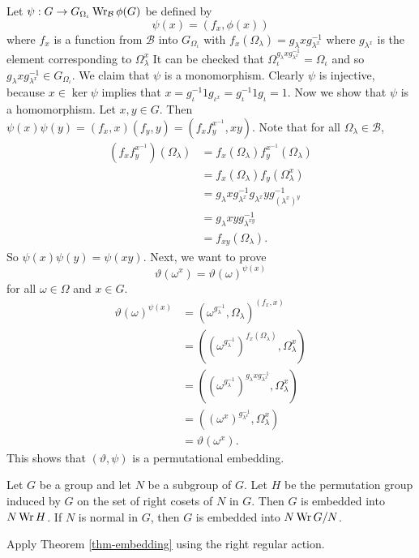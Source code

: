 \begin{sketch}
	Let $\psi:G \to G_{\Omega_\iota} \operatorname{Wr}_{\mathcal{B}} \phi(G)$ be defined by
	\begin{equation*}
		\psi(x) = (f_x,\phi(x))
	\end{equation*}
	where $f_x$ is a function from $\mathcal{B}$ into $G_{\Omega_\iota}$ with $f_x(\Omega_\lambda) = g_{\lambda}xg_{\lambda^x}^{-1}$ where $g_{\lambda^x}$ is the element corresponding to $\Omega_\lambda^x$ It can be checked that $\Omega_\iota^{g_\lambda xg_{\lambda^x}^{-1}} = \Omega_\iota$ and so $g_\lambda xg_{\lambda^x}^{-1}\in G_{\Omega_\iota}$. We claim that $\psi$ is a monomorphism. Clearly $\psi$ is injective, because $x\in \ker \psi$ implies that  $x =g_\iota^{-1} 1 g_{\iota^x} = g_\iota^{-1} 1 g_{\iota} =1$. Now we show that $\psi$ is a homomorphism. Let $x,y\in G$. Then $
		\psi(x)\psi(y) = (f_x,x)(f_y,y) = (f_xf_y^{x^{-1}},xy)$. Note that for all $\Omega_\lambda \in \mathcal{B}$, 
\begin{align*}
	(f_xf_y^{x^{-1}})(\Omega_\lambda) &= f_x(\Omega_\lambda)f_y^{x^{-1}}(\Omega_\lambda) 
	\\
	&= f_x(\Omega_\lambda)f_y(\Omega_\lambda^x) 
	\\
	&= g_{\lambda}xg_{\lambda^x}^{-1}g_{\lambda^x}yg_{(\lambda^{x})^y}^{-1} 
	\\
	&= g_\lambda xy g_{\lambda^{xy}}^{-1} 
	\\
	&= f_{xy}(\Omega_\lambda).
\end{align*}
So $\psi(x)\psi(y) = \psi(xy)$. Next, we want to prove
\begin{equation*}
	\vartheta(\omega^x) = \vartheta(\omega)^{\psi(x)}
\end{equation*}
for all $\omega\in\Omega$ and $x\in G$.
\begin{align*}
	\vartheta(\omega)^{\psi(x)} &= (\omega^{g_\lambda^{-1}},\Omega_\lambda)^{(f_x,x)} 
	\\
	&= ((\omega^{g_\lambda^{-1}})^{f_x(\Omega_\lambda)},\Omega_\lambda^x) 
	\\
	&= ((\omega^{g_\lambda^{-1}})^{g_\lambda x g_{\lambda^x}^{-1}},\Omega_\lambda^x) 
	\\
	&= ((\omega^x)^{g_{\lambda^x}^{-1}},\Omega_\lambda^x) 
	\\
	&= \vartheta(\omega^x).
\end{align*}
This shows that $(\vartheta,\psi)$ is a permutational embedding.
\end{sketch}

\begin{corollary}
	Let $G$ be a group and let $N$ be a subgroup of $G$. Let $H$ be the permutation group induced by $G$ on the set of right cosets of $N$ in $G$. Then $G$ is embedded into $N \operatorname{Wr} H$. If $N$ is normal in $G$, then $G$ is embedded into $N\operatorname{Wr} G/N$.
\end{corollary}
\begin{sketch}
	Apply Theorem \ref{thm-embedding} using the right regular action. 
\end{sketch}


